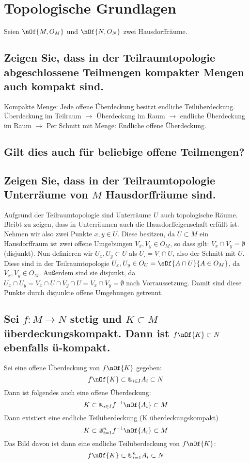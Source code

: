 \documentclass[11pt,a4paper]{scrartcl}
\begin{document}
	\section{Topologische Grundlagen}
	Seien $\nOf{M,O_M}$ und $\nOf{N,O_N}$ zwei Hausdorffräume.

	\subsection{Zeigen Sie, dass in der Teilraumtopologie abgeschlossene Teilmengen kompakter Mengen auch kompakt sind.}
	Kompakte Menge: Jede offene Überdeckung besitzt endliche Teilüberdeckung. Überdeckung im Teilraum $\rightarrow$ Überdeckung im Raum $\rightarrow$ endliche Überdeckung im Raum $\rightarrow$ Per Schnitt mit Menge: Endliche offene Überdeckung.
 
	\subsection{Gilt dies auch für beliebige offene Teilmengen?}

	\subsection{Zeigen Sie, dass in der Teilraumtopologie Unterräume von $M$ Hausdorffräume sind.}
	Aufgrund der Teilraumtopologie sind Unterräume $U$ auch topologische Räume. Bleibt zu zeigen, dass in Unterräumen auch die Hausdorffeigenschaft erfüllt ist. Nehmen wir also zwei Punkte $x,y \in U$. Diese besitzen, da $U\subset M$ ein Hausdorffraum ist zwei offene Umgebungen $V_x, V_y \in O_M$, so dass gilt: $V_x \cap V_y = \emptyset$ (disjunkt). Nun definieren wir $U_x, U_y \subset U$ als $U_{\cdot} = V_{\cdot} \cap U$, also der Schnitt mit $U$. Diese sind in der Teilraumtopologie $U_x,U_y \in O_U = \sDf{A \cap U}{A \in O_M}$, da $V_x, V_y \in O_M$. Außerdem sind sie disjunkt, da $U_x \cap U_y = V_x \cap U \cap V_y \cap U = V_x \cap V_y = \emptyset$ nach Vorraussetzung. Damit sind diese Punkte durch disjunkte offene Umgebungen getrennt. 
	\subsection{Sei $f: M \to N$ stetig und $K \subset M$ überdeckungskompakt. Dann ist $f\nOf{K} \subset N$ ebenfalls ü-kompakt.}
	Sei eine offene Überdeckung von $f\nOf{K}$ gegeben:
	\begin{equation}
		f\nOf{K} \subset \Cup_{i\in I} A_i \subset N
	\end{equation}
	Dann ist folgendes auch eine offene Überdeckung:
	\begin{equation}
		K \subset \Cup_{i\in I} f^{-1}\nOf{A_i} \subset M
	\end{equation}
	Dann existiert eine endliche Teilüberdeckung (K überdeckungskompakt)
	\begin{equation}
		K \subset \Cup_{i = 1}^n f^{-1}\nOf{A_i} \subset M
	\end{equation}
	Das Bild davon ist dann eine endliche Teilüberdeckung von $f\nOf{K}$:
	\begin{equation}
		f\nOf{K} \subset \Cup_{i = 1}^n A_i \subset N
	\end{equation}
\end{document}
